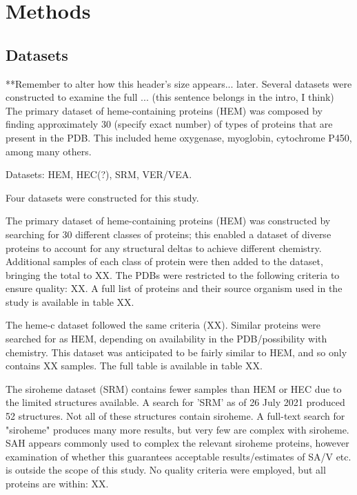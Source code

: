\chapter{Methods}
	
	
	\section*{Datasets}
	**Remember to alter how this header's size appears... later.
	Several datasets were constructed to examine the full ... (this sentence belongs in the intro, I think)
	The primary dataset of heme-containing proteins (HEM) was composed by finding approximately 30 (specify exact number) of types of proteins that are present in the PDB. This included heme oxygenase, myoglobin, cytochrome P450, among many others.
	
	Datasets: HEM, HEC(?), SRM, VER/VEA.
	
	Four datasets were constructed for this study.
	
	The primary dataset of heme-containing proteins (HEM) was constructed by searching for 30 different classes of proteins; this enabled a dataset of diverse proteins to account for any structural deltas to achieve different chemistry. Additional samples of each class of protein were then added to the dataset, bringing the total to XX. The PDBs were restricted to the following criteria to ensure quality: XX. A full list of proteins and their source organism used in the study is available in table XX.
	
	The heme-c dataset followed the same criteria (XX). Similar proteins were searched for as HEM, depending on availability in the PDB/possibility with chemistry. This dataset was anticipated to be fairly similar to HEM, and so only contains XX samples. The full table is available in table XX. 
	
	The siroheme dataset (SRM) contains fewer samples than HEM or HEC due to the limited structures available. A search for 'SRM' as of 26 July 2021 produced 52 structures. Not all of these structures contain siroheme. A full-text search for "siroheme" produces many more results, but very few are complex with siroheme. SAH appears commonly used to complex the relevant siroheme proteins, however examination of whether this guarantees acceptable results/estimates of SA/V etc. is outside the scope of this study. No quality criteria were employed, but all proteins are within: XX.
	
